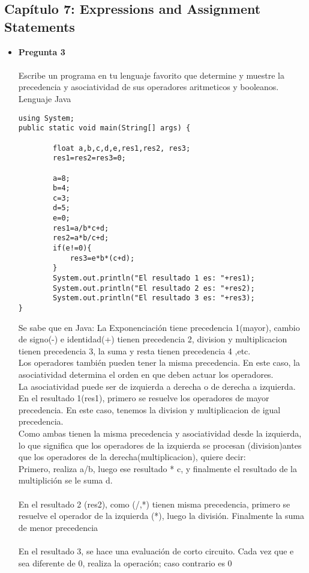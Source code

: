 \documentclass[12pt,oneside]{article}
\begin{document}
\subsection{Capítulo 7: Expressions and Assignment Statements}
\begin{itemize}
\item {\bf Pregunta 3} \\\\
Escribe un programa en tu lenguaje favorito que determine y muestre la precedencia y asociatividad de sus operadores aritmeticos y booleanos.\\
Lenguaje Java\\
\begin{lstlisting}[frame=single]  % Start your code-block
using System;
public static void main(String[] args) {
        
        float a,b,c,d,e,res1,res2, res3;
        res1=res2=res3=0;
        
        a=8;
        b=4;
        c=3;
        d=5;
        e=0;
        res1=a/b*c+d;
        res2=a*b/c+d;
        if(e!=0){
            res3=e*b*(c+d);
        }
        System.out.println("El resultado 1 es: "+res1);
        System.out.println("El resultado 2 es: "+res2);
        System.out.println("El resultado 3 es: "+res3);
}

\end{lstlisting}

Se sabe que en Java: La Exponenciación tiene precedencia 1(mayor), cambio de signo(-) e identidad(+) tienen precedencia 2, division y multiplicacion tienen precedencia 3, la suma y resta tienen precedencia 4 ,etc.\\
Los operadores también pueden tener la misma precedencia. En este caso, la asociatividad determina el orden en que deben actuar los operadores. \\
La asociatividad puede ser de izquierda a derecha o de derecha a izquierda.\\
En el resultado 1(res1), primero se resuelve los operadores de mayor precedencia. En este caso, tenemos la division y multiplicacion de igual precedencia.\\
Como ambas tienen la misma precedencia y asociatividad desde la izquierda, lo que significa que los operadores de la izquierda se procesan (division)antes que los operadores de la derecha(multiplicacion), quiere decir:\\
Primero, realiza a/b, luego ese resultado * c, y finalmente el resultado de la multiplición se le suma d. \\\\
En el resultado 2 (res2), como (/,*) tienen misma precedencia, primero se resuelve el operador de la izquierda (*), luego la división. Finalmente la suma de menor precedencia\\\\
En el resultado 3, se hace una evaluación de corto circuito. Cada vez que e sea diferente de 0, realiza la operación; caso contrario es 0\\\\\\


\end{itemize}
\end{document}
